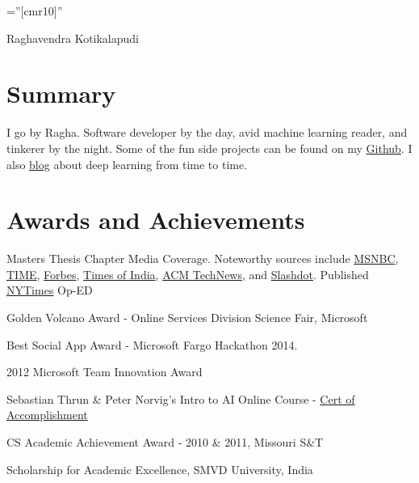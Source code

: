 \documentclass[a4paper,11pt]{article}
\makeatletter
\newcommand*{\compress}{\@minipagetrue}
\makeatother
\begin{document}
\pagestyle{empty} %
\font\fb=''[cmr10]'' %


\par{\centering
		{\Huge Raghavendra Kotikalapudi
    }\bigskip\par}

\section{Summary}
I go by Ragha. Software developer by the day, avid machine learning reader, and tinkerer by the night. Some of the fun side projects can be found on my \href{https://github.com/raghakot}{Github}. I also \href{http://raghakot.github.io/}{blog} about deep learning from time to time.

\section{Awards and Achievements}
\begin{minipage}[t]{\textwidth}
    \begin{compactitem} \compress
        \item Masters Thesis Chapter Media Coverage. Noteworthy sources include \href{http://vitals.msnbc.msn.com/_news/2012/05/18/11757211-depressed-people-spend-more-time-chatting-online?lite}{MSNBC}, \href{http://healthland.time.com/2012/06/22/the-internet-knows-youre-depressed-but-can-it-help-you/}{TIME}, \href{http://www.forbes.com/sites/kashmirhill/2012/06/21/fascinating-how-you-use-the-internet-may-reveal-youre-depressed/}{Forbes}, \href{http://articles.timesofindia.indiatimes.com/2012-05-17/computing/31748166_1_depressed-students-internet-usage-internet-data}{Times of India}, \href{http://technews.acm.org/archives.cfm?fo=2012-05-may/may-21-2012.html#583682}{ACM TechNews}, and
            \href{http://tech.slashdot.org/story/12/05/22/2039246/depressed-people-surf-the-web-differently}{Slashdot}. Published \href{http://www.nytimes.com/2012/06/17/opinion/sunday/how-depressed-people-use-the-internet.html?_r=3}{NYTimes} Op-ED
        \item Golden Volcano Award  - Online Services Division Science Fair, Microsoft
        \item Best Social App Award - Microsoft Fargo Hackathon 2014.
        \item 2012 Microsoft Team Innovation Award
        \item Sebastian Thrun \& Peter Norvig's Intro to AI Online Course - \href{http://tinyurl.com/ai-cert}{Cert of Accomplishment}
        \item CS Academic Achievement Award - 2010 \& 2011, Missouri S\&T
        \item Scholarship for Academic Excellence, SMVD University, India
    \end{compactitem}
\end{minipage}
\end{document}
